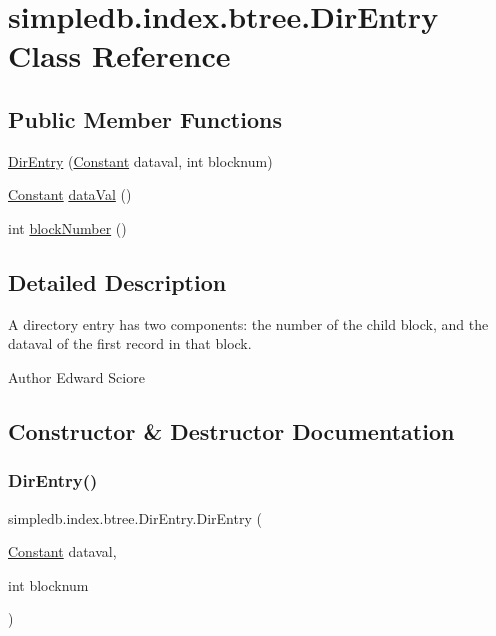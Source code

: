 \hypertarget{classsimpledb_1_1index_1_1btree_1_1DirEntry}{}\section{simpledb.\+index.\+btree.\+Dir\+Entry Class Reference}
\label{classsimpledb_1_1index_1_1btree_1_1DirEntry}
\subsection*{Public Member Functions}
\begin{DoxyCompactItemize}
\item 
\hyperlink{classsimpledb_1_1index_1_1btree_1_1DirEntry_a9cbacd41de271cc7fed663c2286353f6}{Dir\+Entry} (\hyperlink{classsimpledb_1_1query_1_1Constant}{Constant} dataval, int blocknum)
\item 
\hyperlink{classsimpledb_1_1query_1_1Constant}{Constant} \hyperlink{classsimpledb_1_1index_1_1btree_1_1DirEntry_a7cbdc9d126bd11396e03cf671bf7d93e}{data\+Val} ()
\item 
int \hyperlink{classsimpledb_1_1index_1_1btree_1_1DirEntry_a2a400c20859d3be59d333b14802711e4}{block\+Number} ()
\end{DoxyCompactItemize}


\subsection{Detailed Description}
A directory entry has two components\+: the number of the child block, and the dataval of the first record in that block. \begin{DoxyAuthor}{Author}
Edward Sciore 
\end{DoxyAuthor}


\subsection{Constructor \& Destructor Documentation}
\mbox{\label{classsimpledb_1_1index_1_1btree_1_1DirEntry_a9cbacd41de271cc7fed663c2286353f6}} 
\subsubsection{\texorpdfstring{Dir\+Entry()}{DirEntry()}}
{\footnotesize\ttfamily simpledb.\+index.\+btree.\+Dir\+Entry.\+Dir\+Entry (\begin{DoxyParamCaption}\item[{\hyperlink{classsimpledb_1_1query_1_1Constant}{Constant}}]{dataval,  }\item[{int}]{blocknum }\end{DoxyParamCaption})\hspace{0.3cm}{\ttfamily [inline]}}

